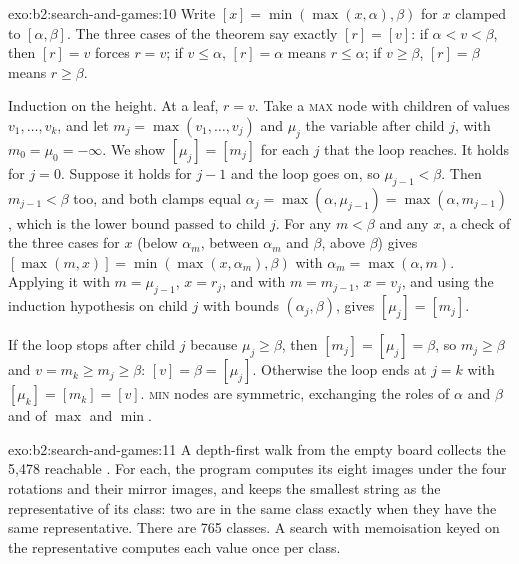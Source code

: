 \begin{solution}{exo:b2:search-and-games:10}
Write $[x] = \min(\max(x, \alpha), \beta)$ for $x$ clamped to $[\alpha, \beta]$. The three cases of the theorem say exactly
$[r] = [v]$: if $\alpha < v < \beta$, then $[r] = v$ forces $r = v$; if $v \leq \alpha$, $[r] = \alpha$ means $r \leq
\alpha$; if $v \geq \beta$, $[r] = \beta$ means $r \geq \beta$.

Induction on the height. At a leaf, $r = v$. Take a \textsc{max} node with children of values $v_1, \dots, v_k$, and let
$m_j = \max(v_1, \dots, v_j)$ and $\mu_j$ the variable  after child $j$, with $m_0 = \mu_0 = -\infty$. We
show $[\mu_j] = [m_j]$ for each $j$ that the loop reaches. It holds for $j = 0$. Suppose it holds for $j - 1$ and the
loop goes on, so $\mu_{j-1} < \beta$. Then $m_{j-1} < \beta$ too, and both clamps equal $\alpha_j = \max(\alpha,
\mu_{j-1}) = \max(\alpha, m_{j-1})$, which is the lower bound passed to child $j$. For any $m < \beta$ and any $x$, a
check of the three cases for $x$ (below $\alpha_m$, between $\alpha_m$ and $\beta$, above $\beta$) gives $[\max(m, x)] = \min(\max(x, \alpha_m), \beta)$ with $\alpha_m = \max(\alpha,
m)$. Applying it with $m = \mu_{j-1}$, $x = r_j$, and with $m = m_{j-1}$, $x = v_j$, and using the induction hypothesis on
child $j$ with bounds $(\alpha_j, \beta)$, gives $[\mu_j] = [m_j]$.

If the loop stops after child $j$ because $\mu_j \geq \beta$, then $[m_j] = [\mu_j] = \beta$, so $m_j \geq \beta$ and
$v = m_k \geq m_j \geq \beta$: $[v] = \beta = [\mu_j]$. Otherwise the loop ends at $j = k$ with $[\mu_k] = [m_k] = [v]$.
\textsc{min} nodes are symmetric, exchanging the roles of $\alpha$ and $\beta$ and of $\max$ and $\min$.
\end{solution}

\begin{solution}{exo:b2:search-and-games:11}
A depth-first walk from the empty board collects the 5,478 reachable . For each, the program computes its eight
images under the four rotations and their mirror images, and keeps the smallest string as the representative of its
class: two  are in the same class exactly when they have the same representative. There are 765 classes. A
search with memoisation keyed on the representative computes each value once per class.
\end{solution}

